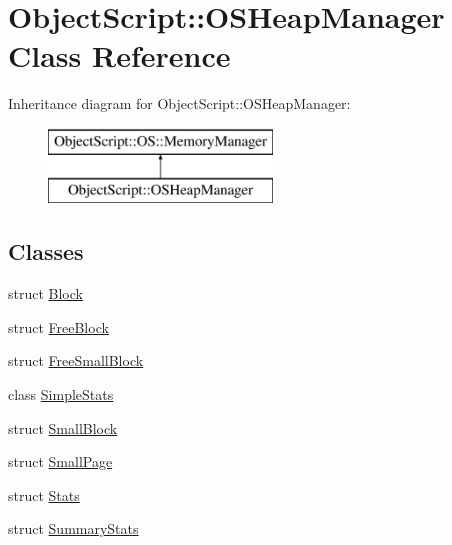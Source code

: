 \hypertarget{class_object_script_1_1_o_s_heap_manager}{}\section{Object\+Script\+:\+:O\+S\+Heap\+Manager Class Reference}
\label{class_object_script_1_1_o_s_heap_manager}
Inheritance diagram for Object\+Script\+:\+:O\+S\+Heap\+Manager\+:\begin{figure}[H]
\begin{center}
\leavevmode
\includegraphics[height=2.000000cm]{class_object_script_1_1_o_s_heap_manager}
\end{center}
\end{figure}
\subsection*{Classes}
\begin{DoxyCompactItemize}
\item 
struct \hyperlink{struct_object_script_1_1_o_s_heap_manager_1_1_block}{Block}
\item 
struct \hyperlink{struct_object_script_1_1_o_s_heap_manager_1_1_free_block}{Free\+Block}
\item 
struct \hyperlink{struct_object_script_1_1_o_s_heap_manager_1_1_free_small_block}{Free\+Small\+Block}
\item 
class \hyperlink{class_object_script_1_1_o_s_heap_manager_1_1_simple_stats}{Simple\+Stats}
\item 
struct \hyperlink{struct_object_script_1_1_o_s_heap_manager_1_1_small_block}{Small\+Block}
\item 
struct \hyperlink{struct_object_script_1_1_o_s_heap_manager_1_1_small_page}{Small\+Page}
\item 
struct \hyperlink{struct_object_script_1_1_o_s_heap_manager_1_1_stats}{Stats}
\item 
struct \hyperlink{struct_object_script_1_1_o_s_heap_manager_1_1_summary_stats}{Summary\+Stats}
\end{DoxyCompactItemize}
